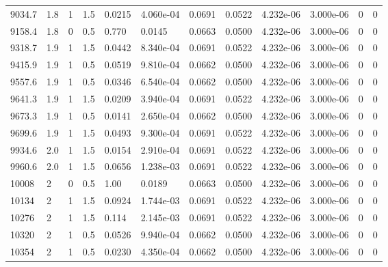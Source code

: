 \documentclass[preview]{standalone}
\begin{document}
{{{\begin{tabular}{L{1.2cm}C{1.2cm} C{0.3cm}C{0.5cm} C{1.4cm}C{1.4cm} C{1.4cm}C{1.4cm} C{1.6cm}C{1.6cm} C{1.6cm}C{1.6cm}}
  9034.7  &   1.8  & 1     & 1.5 &  0.0215  & 4.060e-04  &  0.0691&   0.0522& 4.232e-06 & 3.000e-06   &  0 & 0  \\ 
  9158.4  &   1.8  & 0     & 0.5 &  0.770  & 0.0145  &  0.0663&   0.0500& 4.232e-06 & 3.000e-06   &  0 & 0  \\ 
  9318.7  &   1.9  & 1     & 1.5 &  0.0442  & 8.340e-04  &  0.0691&   0.0522& 4.232e-06 & 3.000e-06   &  0 & 0  \\ 
  9415.9  &   1.9  & 1     & 0.5 &  0.0519  & 9.810e-04  &  0.0662&   0.0500& 4.232e-06 & 3.000e-06   &  0 & 0  \\ 
  9557.6  &   1.9  & 1     & 0.5 &  0.0346  & 6.540e-04  &  0.0662&   0.0500& 4.232e-06 & 3.000e-06   &  0 & 0  \\ 
  9641.3  &   1.9  & 1     & 1.5 &  0.0209  & 3.940e-04  &  0.0691&   0.0522& 4.232e-06 & 3.000e-06   &  0 & 0  \\ 
  9673.3  &   1.9  & 1     & 0.5 &  0.0141  & 2.650e-04  &  0.0662&   0.0500& 4.232e-06 & 3.000e-06   &  0 & 0  \\ 
  9699.6  &   1.9  & 1     & 1.5 &  0.0493  & 9.300e-04  &  0.0691&   0.0522& 4.232e-06 & 3.000e-06   &  0 & 0  \\ 
  9934.6  &   2.0  & 1     & 1.5 &  0.0154  & 2.910e-04  &  0.0691&   0.0522& 4.232e-06 & 3.000e-06   &  0 & 0  \\ 
  9960.6  &   2.0  & 1     & 1.5 &  0.0656  & 1.238e-03  &  0.0691&   0.0522& 4.232e-06 & 3.000e-06   &  0 & 0  \\ 
  10008  &     2  & 0     & 0.5 &  1.00  & 0.0189  &  0.0663&   0.0500& 4.232e-06 & 3.000e-06   &  0 & 0  \\ 
  10134  &     2  & 1     & 1.5 &  0.0924  & 1.744e-03  &  0.0691&   0.0522& 4.232e-06 & 3.000e-06   &  0 & 0  \\ 
  10276  &     2  & 1     & 1.5 &  0.114  & 2.145e-03  &  0.0691&   0.0522& 4.232e-06 & 3.000e-06   &  0 & 0  \\ 
  10320  &     2  & 1     & 0.5 &  0.0526  & 9.940e-04  &  0.0662&   0.0500& 4.232e-06 & 3.000e-06   &  0 & 0  \\ 
  10354  &     2  & 1     & 0.5 &  0.0230  & 4.350e-04  &  0.0662&   0.0500& 4.232e-06 & 3.000e-06   &  0 & 0  \\ 
\hline 
\end{tabular} 

}}}
\end{document}
